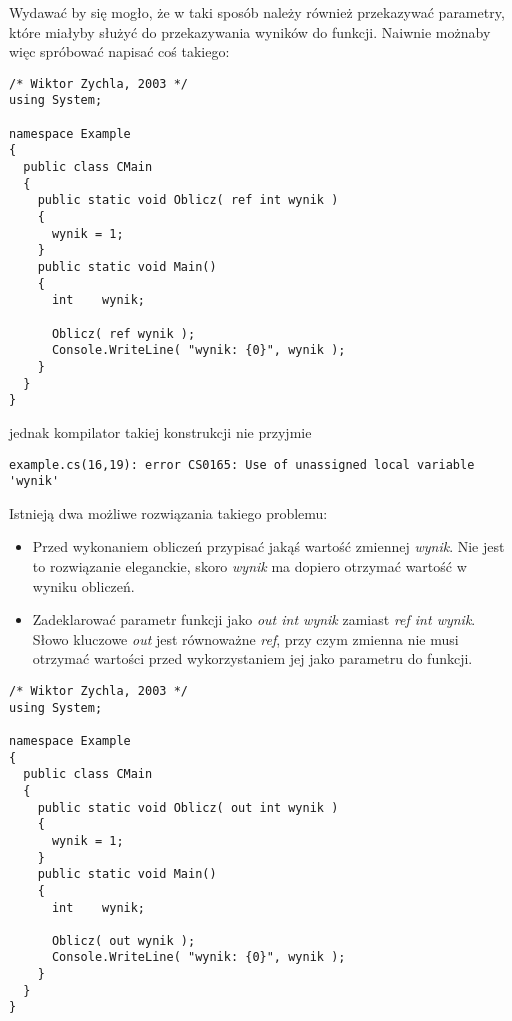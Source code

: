 Wydawać by się mogło, że w taki sposób należy również przekazywać parametry, które miałyby służyć do
przekazywania wyników do funkcji. Naiwnie możnaby więc spróbować napisać coś takiego:

\begin{scriptsize}
\begin{verbatim}
/* Wiktor Zychla, 2003 */
using System;

namespace Example
{
  public class CMain
  {    
    public static void Oblicz( ref int wynik )
    {
      wynik = 1;
    }
    public static void Main()
    {
      int    wynik;

      Oblicz( ref wynik );
      Console.WriteLine( "wynik: {0}", wynik );
    }
  }
}
\end{verbatim}
\end{scriptsize}

jednak kompilator takiej konstrukcji nie przyjmie

\begin{scriptsize}
\begin{verbatim}
example.cs(16,19): error CS0165: Use of unassigned local variable 'wynik'
\end{verbatim}
\end{scriptsize}

Istnieją dwa możliwe rozwiązania takiego problemu:
\begin{itemize}
\item Przed wykonaniem obliczeń przypisać jakąś wartość zmiennej {\em wynik}. 
Nie jest to rozwiązanie eleganckie, skoro {\em wynik} ma dopiero otrzymać wartość w wyniku obliczeń.
\item Zadeklarować parametr funkcji jako {\em out int wynik} zamiast {\em ref int wynik}. Słowo
kluczowe {\em out} jest równoważne {\em ref}, przy czym zmienna nie musi otrzymać wartości przed
wykorzystaniem jej jako parametru do funkcji.
\end{itemize}

\begin{scriptsize}
\begin{verbatim}
/* Wiktor Zychla, 2003 */
using System;

namespace Example
{
  public class CMain
  {    
    public static void Oblicz( out int wynik )
    {
      wynik = 1;
    }
    public static void Main()
    {
      int    wynik;

      Oblicz( out wynik );
      Console.WriteLine( "wynik: {0}", wynik );
    }
  }
}
\end{verbatim}
\end{scriptsize}

